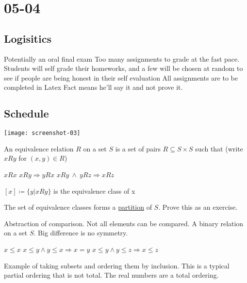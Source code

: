 \documentclass[../598comp.tex]{subfiles}
\date{05-04}
\begin{document}
\section{05-04}

\subsection{Logisitics}
\begin{enumerate}
  \ii
  Potentially an oral final exam
  \ii
  Too many assignments to grade at the fast pace. Students will self grade their homeworks, and a few will be chosen at random to see if people are being honest in their self evaluation
  \ii
  All assignments are to be completed in Latex
  \ii
  Fact means he'll say it and not prove it.
\end{enumerate} 

\subsection{Schedule}
\texttt{[image: screenshot-03]}

\begin{definition}
 An equivalence relation $R$ on a set $S$ is a set of pairs $R \subseteq S \times S$ such that (write $xRy$ for $(x, y) \in R$)
 \begin{enumerate}
  \ii$xRx$
  \ii$xRy \Rightarrow yRx$
  \ii$xRy \ \wedge \  yRz \Rightarrow xRz$
 \end{enumerate} 
\end{definition} 
\begin{definition}
  
$[x] \coloneqq \{y | xRy \}$ is the equivalence class of x

The set of equivalence classes forms a \ul{partition} of $S$. Prove this as an exercise.

\end{definition} 
\begin{definition}
  Abstraction of comparison. Not all elements can be compared. A binary relation on a set $S$. Big difference is no symmetry.
  \begin{enumerate}
    \ii
    $x \leq x$
    \ii
    $x \leq y \wedge y \leq x \Rightarrow x = y$
    \ii
    $x \leq y \wedge y \leq z \Rightarrow x \leq z$
  \end{enumerate} 
  Example of taking subsets and ordering them by inclusion. This is a typical partial ordering that is not total. The real numbers are a total ordering.
\end{definition} 
\end{document}
